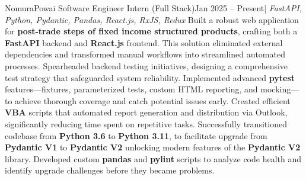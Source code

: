 \resumeSubheading
{Nomura}{Powai}
{Software Engineer Intern (Full Stack)}{Jan 2025 -- Present}{| \textit{FastAPI, Python, Pydantic, Pandas, React.js, RxJS, Redux}}
\resumeItemListStart
{}
{Built a robust web application for \textbf{post-trade steps of fixed income structured products}, crafting both a \textbf{FastAPI} backend and \textbf{React.js} frontend. This solution eliminated external dependencies and transformed manual workflows into streamlined automated processes.}
{Spearheaded backend testing initiatives, designing a comprehensive test strategy that safeguarded system reliability. Implemented advanced \textbf{pytest} features—fixtures, parameterized tests, custom HTML reporting, and mocking—to achieve thorough coverage and catch potential issues early.}
{Created efficient \textbf{VBA} scripts that automated report generation and distribution via Outlook, significantly reducing time spent on repetitive tasks.}
{Successfully transitioned codebase from \textbf{Python 3.6} to \textbf{Python 3.11}, to facilitate upgrade from \textbf{Pydantic V1} to \textbf{Pydantic V2} unlocking modern features of the \textbf{Pydantic V2} library. Developed custom \textbf{pandas} and \textbf{pylint} scripts to analyze code health and identify upgrade challenges before they became problems.}
\resumeItemListEnd